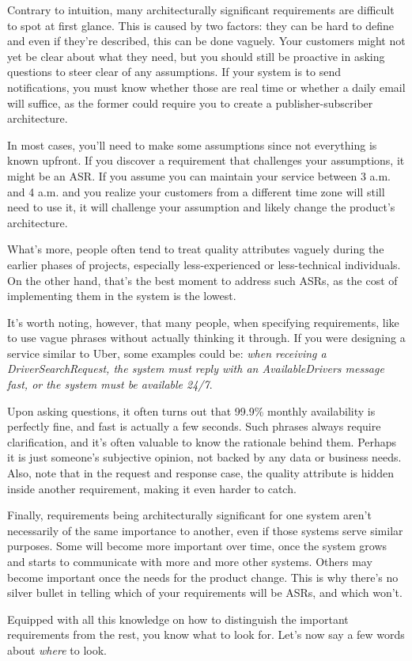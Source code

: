 Contrary to intuition, many architecturally significant requirements are difficult to spot at first glance. This is caused by two factors: they can be hard to define and even if they're described, this can be done vaguely. Your customers might not yet be clear about what they need, but you should still be proactive in asking questions to steer clear of any assumptions. If your system is to send notifications, you must know whether those are real time or whether a daily email will suffice, as the former could require you to create a publisher-subscriber architecture. 

In most cases, you'll need to make some assumptions since not everything is known upfront. If you discover a requirement that challenges your assumptions, it might be an ASR. If you assume you can maintain your service between 3 a.m. and 4 a.m. and you realize your customers from a different time zone will still need to use it, it will challenge your assumption and likely change the product's architecture.

What's more, people often tend to treat quality attributes vaguely during the earlier phases of projects, especially less-experienced or less-technical individuals. On the other hand, that's the best moment to address such ASRs, as the cost of implementing them in the system is the lowest.

It's worth noting, however, that many people, when specifying requirements, like to use vague phrases without actually thinking it through. If you were designing a service similar to Uber, some examples could be: \textit{when receiving a DriverSearchRequest, the system must reply with an AvailableDrivers message fast, or the system must be available 24/7}.

Upon asking questions, it often turns out that 99.9\% monthly availability is perfectly fine, and fast is actually a few seconds. Such phrases always require clarification, and it's often valuable to know the rationale behind them. Perhaps it is just someone's subjective opinion, not backed by any data or business needs. Also, note that in the request and response case, the quality attribute is hidden inside another requirement, making it even harder to catch.

Finally, requirements being architecturally significant for one system aren't necessarily of the same importance to another, even if those systems serve similar purposes. Some will become more important over time, once the system grows and starts to communicate with more and more other systems. Others may become important once the needs for the product change. This is why there's no silver bullet in telling which of your requirements will be ASRs, and which won't. 

Equipped with all this knowledge on how to distinguish the important requirements from the rest, you know what to look for. Let's now say a few words about \textit{where} to look.




























